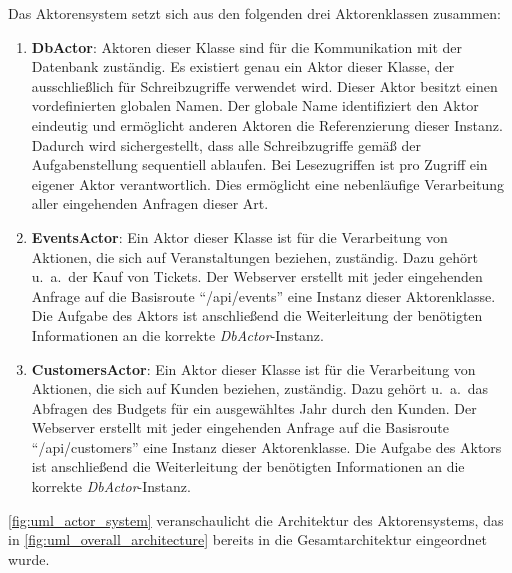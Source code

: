 Das Aktorensystem setzt sich aus den folgenden drei Aktorenklassen zusammen:
\begin{enumerate}
    \item \textbf{DbActor}: Aktoren dieser Klasse sind für die Kommunikation mit der Datenbank zuständig.
    Es existiert genau ein Aktor dieser Klasse, der ausschließlich für Schreibzugriffe verwendet wird.
    Dieser Aktor besitzt einen vordefinierten globalen Namen.
    Der globale Name identifiziert den Aktor eindeutig und ermöglicht anderen Aktoren die Referenzierung dieser Instanz.
    Dadurch wird sichergestellt, dass alle Schreibzugriffe gemäß der Aufgabenstellung sequentiell ablaufen.
    Bei Lesezugriffen ist pro Zugriff ein eigener Aktor verantwortlich.
    Dies ermöglicht eine nebenläufige Verarbeitung aller eingehenden Anfragen dieser Art.
    \item \textbf{EventsActor}: Ein Aktor dieser Klasse ist für die Verarbeitung von Aktionen, die sich auf Veranstaltungen beziehen, zuständig.
    Dazu gehört u.\ a.\ der Kauf von Tickets.
    Der Webserver erstellt mit jeder eingehenden Anfrage auf die Basisroute \enquote{/api/events} eine Instanz dieser Aktorenklasse. 
    Die Aufgabe des Aktors ist anschließend die Weiterleitung der benötigten Informationen an die korrekte \textit{DbActor}-Instanz.
    \item \textbf{CustomersActor}: Ein Aktor dieser Klasse ist für die Verarbeitung von Aktionen, die sich auf Kunden beziehen, zuständig.
    Dazu gehört u.\ a.\ das Abfragen des Budgets für ein ausgewähltes Jahr durch den Kunden.
    Der Webserver erstellt mit jeder eingehenden Anfrage auf die Basisroute \enquote{/api/customers} eine Instanz dieser Aktorenklasse. 
    Die Aufgabe des Aktors ist anschließend die Weiterleitung der benötigten Informationen an die korrekte \textit{DbActor}-Instanz.
\end{enumerate}

\autoref{fig:uml_actor_system} veranschaulicht die Architektur des Aktorensystems, das in \autoref{fig:uml_overall_architecture} bereits in die Gesamtarchitektur eingeordnet wurde.

